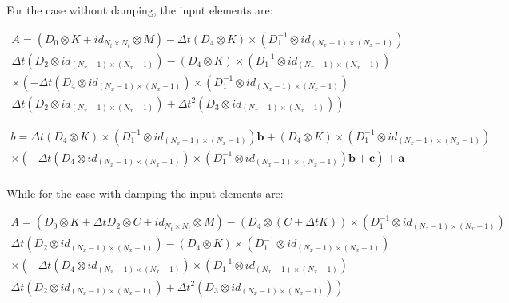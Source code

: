 \documentclass{ws-m3as}
\begin{document}
For the case without damping, the input elements are:

$$
\begin{array}{c}
A = \left(D_0 \otimes K + id_{N_t \times N_t} \otimes  M  \right) - \Delta t \left(D_4 \otimes  K \right) \times \left( D_1^{-1} \otimes  id_{(N_x-1)\times(N_x-1)}\right)  \\
\left. \Delta t \left( D_2 \otimes  id_{(N_x-1)\times(N_x-1)}\right) -  \left( D_4 \otimes   K\right) \times \left( D_1^{-1} \otimes  id_{(N_x-1)\times(N_x-1)}\right) \right. \\
\left.  \times \left( - \Delta t \left(D_4 \otimes  id_{(N_x-1)\times(N_x-1)} \right) \times \left( D_1^{-1} \otimes  id_{(N_x-1)\times(N_x-1)}\right) \right. \right.\\
\left. \Delta t \left( D_2 \otimes  id_{(N_x-1)\times(N_x-1)}\right)  + \Delta t^2 \left( D_3 \otimes  id_{(N_x-1)\times(N_x-1)} \right) \right)
\end{array}
$$

$$
\begin{array}{c}
b = \Delta t \left(D_4 \otimes  K \right) \times \left( D_1^{-1} \otimes  id_{(N_x-1)\times(N_x-1)}\right)  \mathbf{b} +\left( D_4 \otimes   K\right) \times \left( D_1^{-1} \otimes  id_{(N_x-1)\times(N_x-1)}\right) \\
 \times \left( - \Delta t \left(D_4 \otimes  id_{(N_x-1)\times(N_x-1)} \right) \times \left( D_1^{-1} \otimes  id_{(N_x-1)\times(N_x-1)}\right) \mathbf{b}  + \mathbf{c}  \right) + \mathbf{a} \\
\end{array}
$$



While for the case with damping the input elements are:

$$
\begin{array}{c}
A = \left(D_0 \otimes K + \Delta t D_2 \otimes C + id_{N_t \times N_t} \otimes  M  \right) - \left(D_4 \otimes  \left(C+\Delta t K\right)\right) \times \left( D_1^{-1} \otimes  id_{(N_x-1)\times(N_x-1)}\right) \\
\left. \Delta t \left( D_2 \otimes  id_{(N_x-1)\times(N_x-1)}\right) -  \left( D_4 \otimes   K \right) \times \left( D_1^{-1} \otimes  id_{(N_x-1)\times(N_x-1)}\right) \right. \\
\left.  \times \left( - \Delta t \left(D_4 \otimes  id_{(N_x-1)\times(N_x-1)} \right) \times \left( D_1^{-1} \otimes  id_{(N_x-1)\times(N_x-1)}\right) \right. \right. \\
 \left. \Delta t \left( D_2 \otimes  id_{(N_x-1)\times(N_x-1)}\right)  + \Delta t^2 \left( D_3 \otimes  id_{(N_x-1)\times(N_x-1)} \right) \right)  \\
\end{array}
$$
\end{document}

